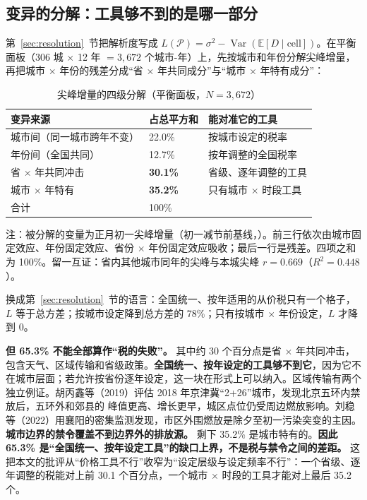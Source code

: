 \subsection{变异的分解：工具够不到的是哪一部分}\label{sec:variance}

第~\ref{sec:resolution}~节把解析度写成 $L(\mathcal{P})=\sigma^2-\operatorname{Var}(\mathbb{E}[D\mid\text{cell}])$。在平衡面板（306 城 $\times$ 12 年 $=3{,}672$ 个城市-年）上，先按城市和年份分解尖峰增量，再把城市 $\times$ 年份的残差分成“省 $\times$ 年共同成分”与“城市 $\times$ 年特有成分”：

\begin{table}[H]
\centering
\caption{尖峰增量的四级分解（平衡面板，$N=3{,}672$）}
\label{tab:variance}
\small
\begin{tabular}{L{6.4cm}R{2.6cm}R{4.6cm}}
\toprule
\textbf{变异来源} & \textbf{占总平方和} & \textbf{能对准它的工具} \\
\midrule
城市间（同一城市跨年不变） & 22.0\% & 按城市设定的税率 \\
年份间（全国共同） & 12.7\% & 按年调整的全国税率 \\
省 $\times$ 年共同冲击 & \textbf{30.1\%} & 省级、逐年调整的工具 \\
城市 $\times$ 年特有 & \textbf{35.2\%} & 只有城市 $\times$ 时段工具 \\
\midrule
合计 & 100\% & \\
\bottomrule
\end{tabular}

\vspace{0.3em}
{\small 注：被分解的变量为正月初一尖峰增量（初一减节前基线，\ugm）。前三行依次由城市固定效应、年份固定效应、省份 $\times$ 年份固定效应吸收；最后一行是残差。四项之和为 100\%。留一互证：省内其他城市同年的尖峰与本城尖峰 $r=0.669$（$R^2=0.448$）。}
\end{table}

换成第~\ref{sec:resolution}~节的语言：全国统一、按年适用的从价税只有一个格子，$L$ 等于总方差；按城市设定降到总方差的 78\%；只有按城市 $\times$ 年份设定，$L$ 才降到 0。

\textbf{但 65.3\% 不能全部算作“税的失败”。} 其中约 30 个百分点是省 $\times$ 年共同冲击，包含天气、区域传输和省级政策。\textbf{全国统一、按年设定的工具够不到它}，因为它不在城市层面；若允许按省份逐年设定，这一块在形式上可以纳入。区域传输有两个独立例证。胡丙鑫等（2019）评估 2018 年京津冀“2+26”城市，发现北京五环内禁放后，五环外和郊县的  峰值更高、增长更早，城区点位仍受周边燃放影响。刘稳等（2022）用襄阳的密集监测发现，市区外围燃放是除夕至初一污染突变的主因。\textbf{城市边界的禁令覆盖不到边界外的排放源。} 剩下 35.2\% 是城市特有的。\textbf{因此 65.3\% 是“全国统一、按年设定工具”的缺口上界，不是税与禁令之间的差距。} 这把本文的批评从“价格工具不行”收窄为“设定层级与设定频率不行”：一个省级、逐年调整的税能对上前 30.1 个百分点，一个城市 $\times$ 时段的工具才能对上最后 35.2 个。

